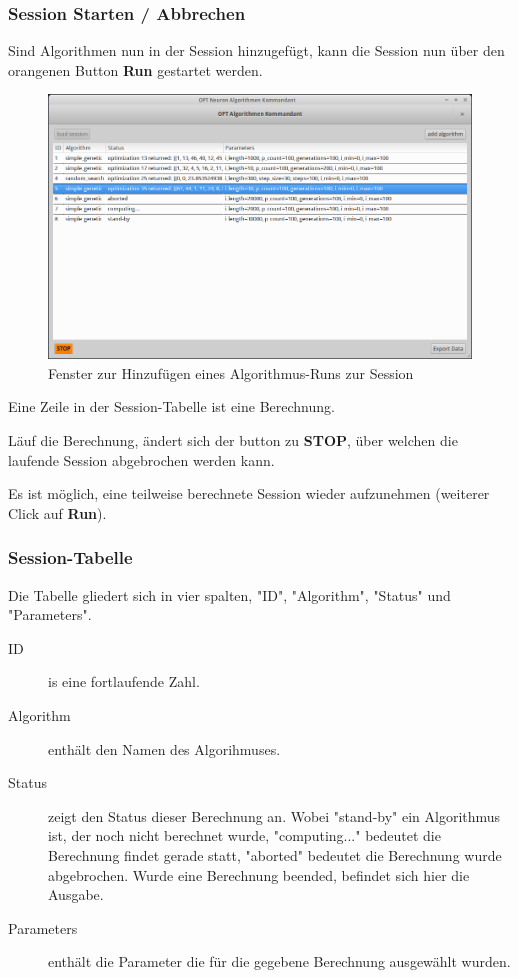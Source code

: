 \documentclass[
  a4paper,               %
  twoside,               %
  DIV=12,                %
  BCOR=8mm,              %
  headinclude=true,      %
  footinclude=false,     %
  numbers=noenddot,      %
  headheight=40pt,       %
  11pt]{scrartcl}        %
\begin{document}
\newpage
\subsubsection{Session Starten / Abbrechen}
Sind Algorithmen nun in der Session hinzugefügt, kann die Session nun über den orangenen Button \textbf{Run} gestartet werden.

\begin{figure}[h]
\includegraphics[scale=.45]{mainframe.png}
\caption{Fenster zur Hinzufügen eines Algorithmus-Runs zur Session}
\end{figure}


Eine Zeile in der Session-Tabelle ist eine Berechnung.

Läuf die Berechnung, ändert sich der button zu \textbf{STOP}, über welchen die laufende Session abgebrochen werden kann.

Es ist möglich, eine teilweise berechnete Session wieder aufzunehmen (weiterer Click auf \textbf{Run}).

\subsubsection{Session-Tabelle}
Die Tabelle gliedert sich in vier spalten, "ID", "Algorithm", "Status" und "Parameters".

\begin{description}
\item[ID] is eine fortlaufende Zahl. \\

\item[Algorithm] enthält den Namen des Algorihmuses.

\item[Status] zeigt den Status dieser Berechnung an. Wobei "stand-by" ein Algorithmus ist, der noch nicht berechnet wurde, "computing..." bedeutet die Berechnung findet gerade statt, "aborted" bedeutet die Berechnung wurde abgebrochen. Wurde eine Berechnung beended, befindet sich hier die Ausgabe.

\item[Parameters] enthält die Parameter die für die gegebene Berechnung ausgewählt wurden.
\end{description}
\end{document}
